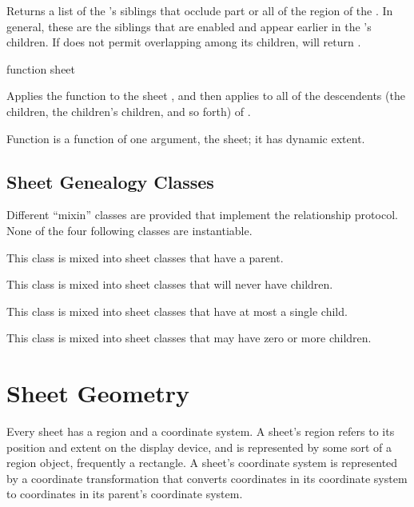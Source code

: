 Returns a list of the  's siblings that occlude part or
all of the region of the .  In general, these are the siblings that
are enabled and appear earlier in the  's children.  If
 does not permit overlapping among its children,
 will return .

\FreshOutputs

 {function sheet}

Applies the function  to the sheet , and then applies
 to all of the descendents (the children, the children's children,
and so forth) of .

Function is a function of one argument, the sheet; it has dynamic extent.


\subsection {Sheet Genealogy Classes}

Different ``mixin'' classes are provided that implement the relationship
protocol.  None of the four following classes are instantiable.


This class is mixed into sheet classes that have a parent.


This class is mixed into sheet classes that will never have children.


This class is mixed into sheet classes that have at most a single child.


This class is mixed into sheet classes that may have zero or more children.


\section {Sheet Geometry}

Every sheet has a region and a coordinate system.  A sheet's region refers to
its position and extent on the display device, and is represented by some sort
of a region object, frequently a rectangle.  A sheet's coordinate system is
represented by a coordinate transformation that converts coordinates in its
coordinate system to coordinates in its parent's coordinate system.

